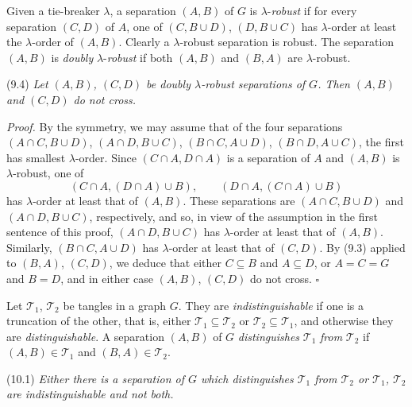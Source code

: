 Given a tie-breaker $\lambda$, a separation $(A, B)$ of $G$ is $\lambda$-\textit{robust} if for every separation $(C, D)$ of $A$, one of $(C, B \cup D)$, $(D, B \cup C)$ has $\lambda$-order at least the $\lambda$-order of $(A, B)$. Clearly a $\lambda$-robust separation is robust. The separation $(A, B)$ is \textit{doubly} $\lambda$-\textit{robust} if both $(A, B)$ and $(B, A)$ are $\lambda$-robust.

\stmt
(9.4) \textit{Let $(A, B)$, $(C, D)$ be doubly $\lambda$-robust separations of $G$. Then $(A, B)$ and $(C, D)$ do not cross.}

\textit{Proof.} By the symmetry, we may assume that of the four separations $(A \cap C, B \cup D)$, $(A \cap D, B \cup C)$, $(B \cap C, A \cup D)$, $(B \cap D, A \cup C)$, the first has smallest $\lambda$-order. Since $(C \cap A, D \cap A)$ is a separation of $A$ and $(A, B)$ is $\lambda$-robust, one of
\begin{equation*}
(C \cap A, (D \cap A) \cup B), \qquad (D \cap A, (C \cap A) \cup B)
\end{equation*}
has $\lambda$-order at least that of $(A, B)$. These separations are $(A \cap C, B \cup D)$ and $(A \cap D, B \cup C)$, respectively, and so, in view of the assumption in the first sentence of this proof, $(A \cap D, B \cup C)$ has $\lambda$-order at least that of $(A, B)$. Similarly, $(B \cap C, A \cup D)$ has $\lambda$-order at least that of $(C, D)$. By (9.3) applied to $(B, A)$, $(C, D)$, we deduce that either $C \subseteq B$ and $A \subseteq D$, or $A = C = G$ and $B = D$, and in either case $(A, B)$, $(C, D)$ do not cross. $\square$


Let $\mathscr{T}_1$, $\mathscr{T}_2$ be tangles in a graph $G$. They are \textit{indistinguishable} if one is a truncation of the other, that is, either $\mathscr{T}_1 \subseteq \mathscr{T}_2$ or $\mathscr{T}_2 \subseteq \mathscr{T}_1$, and otherwise they are \textit{distinguishable}. A separation $(A, B)$ of $G$ \textit{distinguishes} $\mathscr{T}_1$ \textit{from} $\mathscr{T}_2$ if $(A, B) \in \mathscr{T}_1$ and $(B, A) \in \mathscr{T}_2$.

\stmt
(10.1) \textit{Either there is a separation of $G$ which distinguishes $\mathscr{T}_1$ from $\mathscr{T}_2$ or $\mathscr{T}_1$, $\mathscr{T}_2$ are indistinguishable and not both.}

